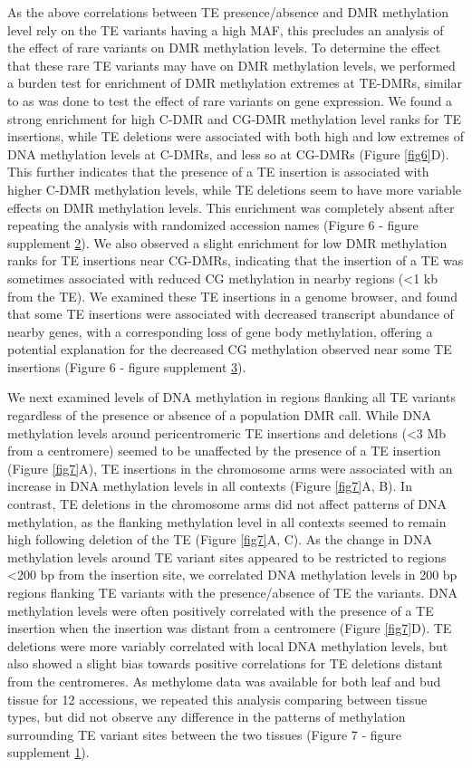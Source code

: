 \documentclass[12pt]{article}
\begin{document}
As the above correlations between TE presence/absence and DMR
methylation level rely on the TE variants having a high MAF, this
precludes an analysis of the effect of rare variants on DMR methylation
levels. To determine the effect that these rare TE variants may have on
DMR methylation levels, we performed a burden test for enrichment of DMR
methylation extremes at TE-DMRs, similar to as was done to test the
effect of rare variants on gene expression. We found a strong enrichment
for high C-DMR and CG-DMR methylation level ranks for TE insertions,
while TE deletions were associated with both high and low extremes of
DNA methylation levels at C-DMRs, and less so at CG-DMRs (Figure \ref{fig6}D).
This further indicates that the presence of a TE insertion is associated
with higher C-DMR methylation levels, while TE deletions seem to have
more variable effects on DMR methylation levels. This enrichment was
completely absent after repeating the analysis with randomized accession
names (Figure 6 - figure supplement \hyperref[fig6s2]{2}). We also observed a slight
enrichment for low DMR methylation ranks for TE insertions near CG-DMRs,
indicating that the insertion of a TE was sometimes associated with
reduced CG methylation in nearby regions (\textless{}1 kb from the TE).
We examined these TE insertions in a genome browser, and found that some
TE insertions were associated with decreased transcript abundance of
nearby genes, with a corresponding loss of gene body methylation,
offering a potential explanation for the decreased CG methylation
observed near some TE insertions (Figure 6 - figure supplement \hyperref[fig6s3]{3}).

We next examined levels of DNA methylation in regions flanking all TE
variants regardless of the presence or absence of a population DMR call.
While DNA methylation levels around pericentromeric TE insertions and
deletions (\textless{}3 Mb from a centromere) seemed to be unaffected by
the presence of a TE insertion (Figure \ref{fig7}A), TE insertions in the
chromosome arms were associated with an increase in DNA methylation
levels in all contexts (Figure \ref{fig7}A, B). In contrast, TE deletions in the
chromosome arms did not affect patterns of DNA methylation, as the
flanking methylation level in all contexts seemed to remain high
following deletion of the TE (Figure \ref{fig7}A, C). As the change in DNA
methylation levels around TE variant sites appeared to be restricted to
regions \textless{}200 bp from the insertion site, we correlated DNA
methylation levels in 200 bp regions flanking TE variants with the
presence/absence of TE the variants. DNA methylation levels were often
positively correlated with the presence of a TE insertion when the
insertion was distant from a centromere (Figure \ref{fig7}D). TE deletions were
more variably correlated with local DNA methylation levels, but also
showed a slight bias towards positive correlations for TE deletions
distant from the centromeres. As methylome data was available for both
leaf and bud tissue for 12 accessions, we repeated this analysis
comparing between tissue types, but did not observe any difference in
the patterns of methylation surrounding TE variant sites between the two
tissues (Figure 7 - figure supplement \hyperref[fig7s1]{1}).
\end{document}
